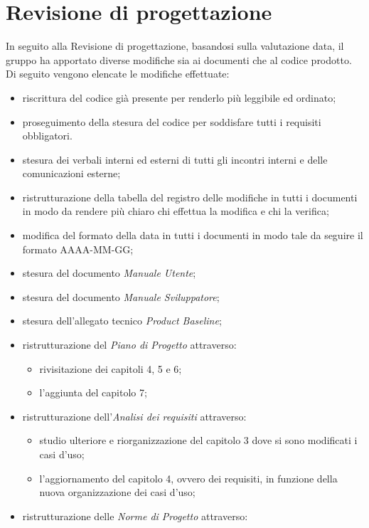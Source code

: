 \section{Revisione di progettazione}\label{EsitiDelleRevisioniRevisioneDiProgettazione}

In seguito alla Revisione di progettazione, basandosi sulla valutazione data, il gruppo ha apportato diverse modifiche sia ai documenti che al codice prodotto. Di seguito vengono elencate le modifiche effettuate:
\begin{itemize}
	\item riscrittura del codice già presente per renderlo più leggibile ed ordinato;
	\item proseguimento della stesura del codice per soddisfare tutti i requisiti obbligatori.
	\item stesura dei verbali interni ed esterni di tutti gli incontri interni e delle comunicazioni esterne;
	\item ristrutturazione della tabella del registro delle modifiche in tutti i documenti in modo da rendere più chiaro chi effettua la modifica e chi la verifica;
	\item modifica del formato della data in tutti i documenti in modo tale da seguire il formato AAAA-MM-GG;
	\item stesura del documento \textit{Manuale Utente};
	\item stesura del documento \textit{Manuale Sviluppatore};
	\item stesura dell'allegato tecnico \textit{Product Baseline};
	\item ristrutturazione del \textit{Piano di Progetto} attraverso:
	\begin{itemize}
		\item rivisitazione dei capitoli 4, 5 e 6;
		\item l'aggiunta del capitolo 7;
	\end{itemize}
	\item ristrutturazione dell'\textit{Analisi dei requisiti} attraverso:
	\begin{itemize}
		\item studio ulteriore e riorganizzazione del capitolo 3 dove si sono modificati i casi d'uso;
		\item l'aggiornamento del capitolo 4, ovvero dei requisiti, in funzione della nuova organizzazione dei casi d'uso;
	\end{itemize}
	\item ristrutturazione delle \textit{Norme di Progetto} attraverso:

\end{itemize}
